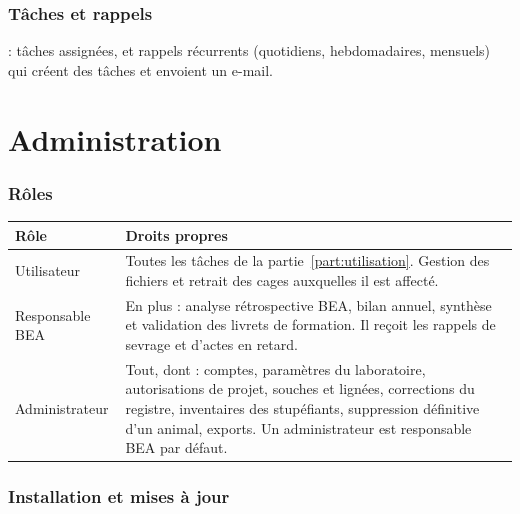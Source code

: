 \documentclass[11pt,a4paper]{article}
\begin{document}
\section{Tâches et rappels}
 : tâches assignées, et rappels
récurrents (quotidiens, hebdomadaires, mensuels) qui créent des tâches et
envoient un e-mail.

\part{Administration}\label{part:admin}

\section{Rôles}\label{sec:roles}
\begin{center}
\begin{tabularx}{\textwidth}{@{}lX@{}}
\toprule
\textbf{Rôle} & \textbf{Droits propres}\\
\midrule
Utilisateur & Toutes les tâches de la partie~\ref{part:utilisation}. Gestion des fichiers et retrait des cages auxquelles il est affecté.\\
Responsable BEA & En plus : analyse rétrospective BEA, bilan annuel, synthèse et validation des livrets de formation. Il reçoit les rappels de sevrage et d'actes en retard.\\
Administrateur & Tout, dont : comptes, paramètres du laboratoire, autorisations de projet, souches et lignées, corrections du registre, inventaires des stupéfiants, suppression définitive d'un animal, exports. Un administrateur est responsable BEA par défaut.\\
\bottomrule
\end{tabularx}
\end{center}

\section{Installation et mises à jour}
\end{document}
